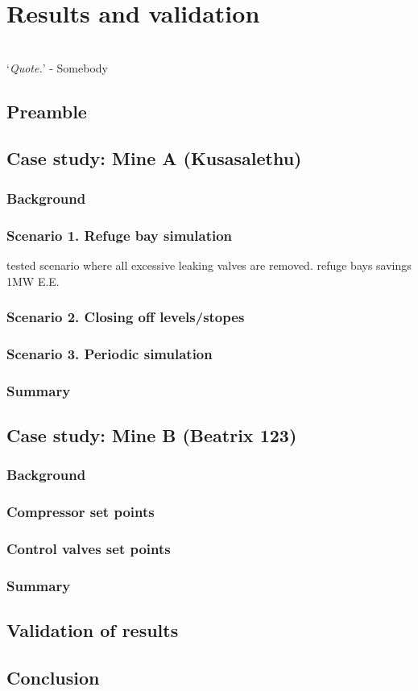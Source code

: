 \chapter{Results and validation}
\vspace{38em}

\hrulefill
\\
\enquote*{\textit{Quote.}} - Somebody\\
\newpage
\section{Preamble}
\section{Case study: Mine A \color{blue}(Kusasalethu)}
	\subsection{Background}
	\subsection{Scenario 1. Refuge bay simulation}
	tested scenario where all excessive leaking valves are removed.
	refuge bays savings 1MW E.E.
	\subsection{Scenario 2. Closing off levels/stopes}
	
	\subsection{Scenario 3. Periodic simulation}
	\subsection{Summary}
\section{Case study: Mine B \color{blue}(Beatrix 123)}
	\subsection{Background}
	\subsection{Compressor set points}
	\subsection{Control valves set points}
	\subsection{Summary}
\section{Validation of results}
\section{Conclusion}